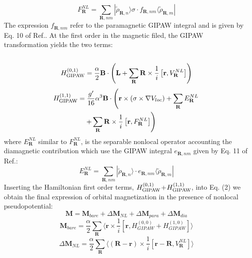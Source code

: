 \documentclass[final,3p,times,twocolumn]{elsarticle}
\newcounter{bla}
\begin{document}
\begin{small}
\begin{equation} 
F_{\mathbf{R}}^{NL}=\sum_{\mathbf{R},nm}^{}|\widetilde{\rho}_{\mathbf{R},n}  \rangle \sigma \cdot {f}_{\mathbf{R},nm} \langle \widetilde{\rho}_{\mathbf{R},m} |
\end{equation} 
The expression ${f}_{\mathbf{R},nm}$  refer to the paramagnetic GIPAW integral and is given by Eq. 10 of Ref.\cite{PhysRevLett.88.086403}. At the first order in the magnetic filed, the GIPAW transformation yields the two terms:\\ \\
\begin{equation}
H_{\rm{GIPAW}}^{(0,1)}=\frac{\alpha}{2}\mathbf{B}\cdot \left(\mathbf{L}+\sum_{\mathbf{R}}^{}\mathbf{R}\times \frac{1}{i}\left [ \mathbf{r}, {V}_\mathbf{R}^{NL} \right ]\right)
\end{equation} 
\begin{align}
H_{\rm{GIPAW}}^{(1,1)} &= \frac{g'}{16}\alpha^{3}\mathbf{B} \cdot \left(\mathbf{r}\times(\sigma\times \nabla V_{loc}) + \sum_{\mathbf{R}}^{}E_{\mathbf{R}}^{NL} \right. \nonumber \\
&\quad \left. + \sum_{\mathbf{R}}\mathbf{R}\times \frac{1}{i}\left[ \mathbf{r}, {F}_\mathbf{R}^{NL} \right] \right)
\end{align} 
where $E_{\mathbf{R}}^{NL}$ similar to $F_{\mathbf{R}}^{NL}$, is the separable nonlocal operator accounting the diamagnetic contribution which use the GIPAW integral ${e}_{\mathbf{R},nm}$ given by Eq. 11 of Ref.\cite{PhysRevLett.88.086403}: 
\begin{equation}
E_{\mathbf{R}}^{NL}=\sum_{\mathbf{R},nm}^{}|\widetilde{\rho}_{\mathbf{R},n}  \rangle \cdot {e}_{\mathbf{R},nm} \langle \widetilde{\rho}_{\mathbf{R},m}|
\end{equation} 
Inserting the Hamiltonian first order terms, $H_{\rm{GIPAW}}^{(0,1)}$+$H_{\rm{GIPAW}}^{(1,1)}$, into Eq. (2) we obtain the final expression of orbital magnetization in the presence of nonlocal pseudopotential: 
\begin{equation}
\mathbf{M} = \mathbf{M}_{bare}+\Delta \mathbf{M}_{NL}+ \Delta \mathbf{M}_{para}+ \Delta \mathbf{M}_{dia}
\end{equation} 
\begin{equation}
\mathbf{M}_{bare}=\frac{\alpha}{2}\sum_{\mathbf{R}}^{}\langle\mathbf{r}\times\frac{1}{i} \left[\mathbf{r},  H_{GIPAW}^{(0,0)}+H_{GIPAW}^{(1,0)}  \right]      \rangle
\end{equation} 
\begin{equation}
\Delta \mathbf{M}_{NL}=\frac{\alpha}{2}\sum_{\mathbf{R}}^{}\langle{(\mathbf{R-r})}\times\frac{1}{i} \left[\mathbf{r-R}, {V}_\mathbf{R}^{NL}   \right]      \rangle

\end{equation}
\end{small}
\end{document}
